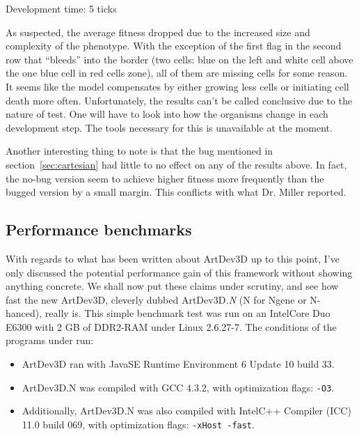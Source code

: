 \begin{center}
	Development time: 5 ticks\newline
	~
	~
\end{center}

As suspected, the average fitness dropped due to the increased size and complexity of the phenotype. With the exception of the first flag in the second row that ``bleeds'' into the border (two cells: blue on the left and white cell above the one blue cell in red cells zone), all of them are missing cells for some reason. It seems like the model compensates by either growing less cells or initiating cell death more often. Unfortunately, the results can't be called conclusive due to the nature of test. One will have to look into how the organisms change in each development step. The tools necessary for this is unavailable at the moment.

Another interesting thing to note is that the bug mentioned in section~\ref{sec:cartesian} had little to no effect on any of the results above. In fact, the no-bug version seem to achieve higher fitness more frequently than the bugged version by a small margin. This conflicts with what Dr. Miller reported.


\subsection{Performance benchmarks}
With regards to what has been written about ArtDev3D up to this point, I've only discussed the potential performance gain of this framework without showing anything concrete. We shall now put these claims under scrutiny, and see how fast the new ArtDev3D, cleverly dubbed ArtDev3D\emph{.N} (N for Ngene or N-hanced), really is. This simple benchmark test was run on an Intel\textregistered Core Duo E6300 with 2 GB of DDR2-RAM under Linux 2.6.27-7. The conditions of the programs under run:

\begin{itemize}
	\itemsep=0pt
	\item ArtDev3D ran with Java\texttrademark SE Runtime Environment 6 Update 10 build 33.
	\item ArtDev3D.N was compiled with GCC 4.3.2, with optimization flags: \texttt{-O3}.
	\item Additionally, ArtDev3D.N was also compiled with Intel\textregistered C++ Compiler (ICC) 11.0 build 069, with optimization flags: \texttt{-xHost -fast}.
\end{itemize}

